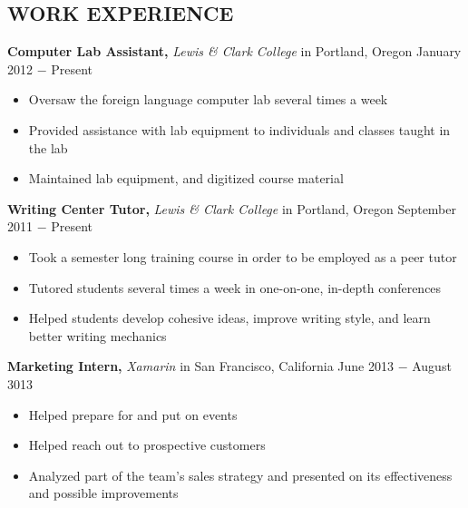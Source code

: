 \documentclass{res} %
\begin{document}
\begin{resume}
\section{WORK EXPERIENCE}

{\bf Computer Lab Assistant,} {\it Lewis \& Clark College} in Portland, Oregon \hfill January 2012 $-$ Present %
\begin{itemize}[label={--}]
	\item Oversaw the foreign language computer lab several times a week
	\item Provided assistance with lab equipment to individuals and classes taught in the lab
	\item Maintained lab equipment, and digitized course material
\end{itemize}

{\bf Writing Center Tutor,} {\it Lewis \& Clark College} in Portland, Oregon \hfill September 2011 $-$ Present %
\begin{itemize}[label={--}]
	\item Took a semester long training course in order to be employed as a peer tutor
	\item Tutored students several times a week in one-on-one, in-depth conferences
	\item Helped students develop cohesive ideas, improve writing style, and learn better writing mechanics
\end{itemize}

{\bf Marketing Intern,} {\it Xamarin} in San Francisco, California \hfill June 2013 $-$ August 3013 %
\begin{itemize}[label={--}]
	\item Helped prepare for and put on events
	\item Helped reach out to prospective customers
	\item Analyzed part of the team's sales strategy and presented on its effectiveness and possible improvements
\end{itemize}


\end{resume}
\end{document}
